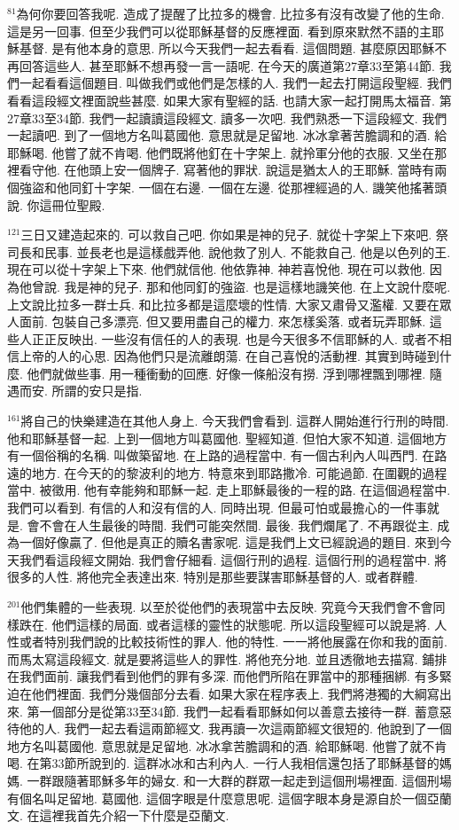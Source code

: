 \documentclass{book}
\begin{document}
$^{81}$為何你要回答我呢.
造成了提醒了比拉多的機會.
比拉多有沒有改變了他的生命.
這是另一回事.
但至少我們可以從耶穌基督的反應裡面.
看到原來默然不語的主耶穌基督.
是有他本身的意思.
所以今天我們一起去看看.
這個問題.
甚麼原因耶穌不再回答這些人.
甚至耶穌不想再發一言一語呢.
在今天的廣道第27章33至第44節.
我們一起看看這個題目.
叫做我們或他們是怎樣的人.
我們一起去打開這段聖經.
我們看看這段經文裡面說些甚麼.
如果大家有聖經的話.
也請大家一起打開馬太福音.
第27章33至34節.
我們一起讀讀這段經文.
讀多一次吧.
我們熟悉一下這段經文.
我們一起讀吧.
到了一個地方名叫葛國他.
意思就是足留地.
冰冰拿著苦膽調和的酒.
給耶穌喝.
他嘗了就不肯喝.
他們既將他釘在十字架上.
就拎軍分他的衣服.
又坐在那裡看守他.
在他頭上安一個牌子.
寫著他的罪狀.
說這是猶太人的王耶穌.
當時有兩個強盜和他同釘十字架.
一個在右邊.
一個在左邊.
從那裡經過的人.
譏笑他搖著頭說.
你這冊位聖殿.

$^{121}$三日又建造起來的.
可以救自己吧.
你如果是神的兒子.
就從十字架上下來吧.
祭司長和民事.
並長老也是這樣戲弄他.
說他救了別人.
不能救自己.
他是以色列的王.
現在可以從十字架上下來.
他們就信他.
他依靠神.
神若喜悅他.
現在可以救他.
因為他曾說.
我是神的兒子.
那和他同釘的強盜.
也是這樣地譏笑他.
在上文說什麼呢.
上文說比拉多一群士兵.
和比拉多都是這麼壞的性情.
大家又肅骨又濫權.
又要在眾人面前.
包裝自己多漂亮.
但又要用盡自己的權力.
來怎樣奚落.
或者玩弄耶穌.
這些人正正反映出.
一些沒有信任的人的表現.
也是今天很多不信耶穌的人.
或者不相信上帝的人的心思.
因為他們只是流離朗蕩.
在自己喜悅的活動裡.
其實到時碰到什麼.
他們就做些事.
用一種衝動的回應.
好像一條船沒有撈.
浮到哪裡飄到哪裡.
隨遇而安.
所謂的安只是指.

$^{161}$將自己的快樂建造在其他人身上.
今天我們會看到.
這群人開始進行行刑的時間.
他和耶穌基督一起.
上到一個地方叫葛國他.
聖經知道.
但怕大家不知道.
這個地方有一個俗稱的名稱.
叫做築留地.
在上路的過程當中.
有一個古利內人叫西門.
在路遠的地方.
在今天的的黎波利的地方.
特意來到耶路撒冷.
可能過節.
在圍觀的過程當中.
被徵用.
他有幸能夠和耶穌一起.
走上耶穌最後的一程的路.
在這個過程當中.
我們可以看到.
有信的人和沒有信的人.
同時出現.
但最可怕或最擔心的一件事就是.
會不會在人生最後的時間.
我們可能突然間.
最後.
我們爛尾了.
不再跟從主.
成為一個好像贏了.
但他是真正的贖名書家呢.
這是我們上文已經說過的題目.
來到今天我們看這段經文開始.
我們會仔細看.
這個行刑的過程.
這個行刑的過程當中.
將很多的人性.
將他完全表達出來.
特別是那些要謀害耶穌基督的人.
或者群體.

$^{201}$他們集體的一些表現.
以至於從他們的表現當中去反映.
究竟今天我們會不會同樣跌在.
他們這樣的局面.
或者這樣的靈性的狀態呢.
所以這段聖經可以說是將.
人性或者特別我們說的比較技術性的罪人.
他的特性.
一一將他展露在你和我的面前.
而馬太寫這段經文.
就是要將這些人的罪性.
將他充分地.
並且透徹地去描寫.
鋪排在我們面前.
讓我們看到他們的罪有多深.
而他們所陷在罪當中的那種捆綁.
有多緊迫在他們裡面.
我們分幾個部分去看.
如果大家在程序表上.
我們將港獨的大綱寫出來.
第一個部分是從第33至34節.
我們一起看看耶穌如何以善意去接待一群.
蓄意惡待他的人.
我們一起去看這兩節經文.
我再讀一次這兩節經文很短的.
他說到了一個地方名叫葛國他.
意思就是足留地.
冰冰拿苦膽調和的酒.
給耶穌喝.
他嘗了就不肯喝.
在第33節所說到的.
這群冰冰和古利內人.
一行人我相信還包括了耶穌基督的媽媽.
一群跟隨著耶穌多年的婦女.
和一大群的群眾一起走到這個刑場裡面.
這個刑場有個名叫足留地.
葛國他.
這個字眼是什麼意思呢.
這個字眼本身是源自於一個亞蘭文.
在這裡我首先介紹一下什麼是亞蘭文.
\end{document}
